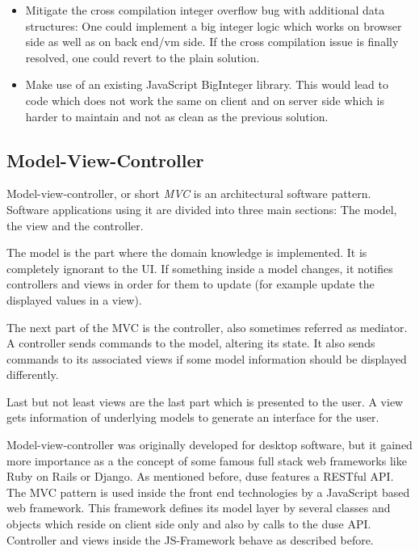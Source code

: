 \begin{itemize}
\begin{itemize}
    \item Mitigate the cross compilation integer overflow bug with additional
    data structures: One could implement a big integer logic which works
    on browser side as well as on back end/vm side. If the cross compilation
    issue is finally resolved, one could revert to the plain solution.

    \item Make use of an existing JavaScript BigInteger library. This would
    lead to code which does not work the same on client and on server side which
    is harder to maintain and not as clean as the previous solution.
  \end{itemize}
\end{itemize}

\subsection{Model-View-Controller}

Model-view-controller, or short \textit{MVC} is an architectural software pattern.
Software applications using it are divided into three main sections: The model,
the view and the controller.

The model is the part where the domain knowledge is implemented. It is completely
ignorant to the UI. If something inside a model changes, it notifies controllers
and views in order for them to update (for example update the displayed values
in a view).

The next part of the MVC is the controller, also sometimes referred as mediator.
A controller sends commands to the model, altering its state. It also sends commands
to its associated views if some model information should be displayed differently.

Last but not least views are the last part which is presented to the user. A view
gets information of underlying models to generate an interface for the user.

Model-view-controller was originally developed for desktop software, but it gained
more importance as a the concept of some famous full stack web frameworks like
Ruby on Rails or Django. As mentioned before, duse features a RESTful API. The 
MVC pattern is used inside the front end technologies by a JavaScript based web
framework. This framework defines its model layer by several classes and objects
which reside on client side only and also by calls to the duse API. Controller and
views inside the JS-Framework behave as described before.

